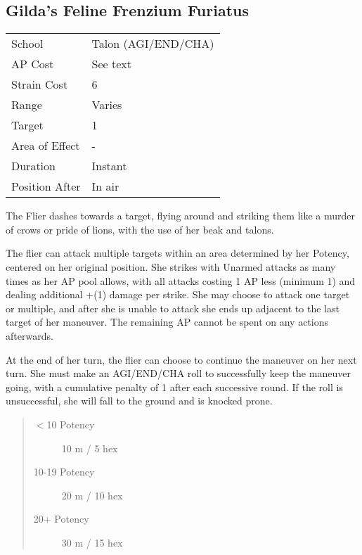 \documentclass[11pt,a4paper,twocolumn]{book}
\begin{document}

\subsection*{Gilda's Feline Frenzium Furiatus}
{
	\begin{tabu} to 75mm{| X[l,4] | X[l,7] |}
		\hline
		School 			& Talon (AGI/END/CHA)			\\
		AP Cost	      	& See text   	\\
		Strain Cost     & 6 				\\
		Range     		& Varies 		\\
		Target      	& 1 				\\
		Area of Effect  & - 	 			\\
		Duration     	& Instant 	 		\\
		Position After  & In air 			\\ \hline
	\end{tabu}
	
}

\medskip

The Flier dashes towards a target, flying around and striking them like a murder of crows or pride of lions, with the use of her beak and talons.

The flier can attack multiple targets within an area determined by her Potency, centered on her original position. She strikes with Unarmed attacks as many times as her AP pool allows, with all attacks costing 1 AP less (minimum 1) and dealing additional +(1) damage per strike. She may choose to attack one target or multiple, and after she is unable to attack she ends up adjacent to the last target of her maneuver. The remaining AP cannot be spent on any actions afterwards.

At the end of her turn, the flier can choose to continue the maneuver on her next turn. She must make an AGI/END/CHA roll to successfully keep the maneuver going, with a cumulative penalty of 1 after each successive round. If the roll is unsuccessful, she will fall to the ground and is knocked prone.

\begin{quote}
	\begin{description}
		\item[$<$10 Potency] 	10 m / 5 hex
		\item[10-19 Potency] 	20 m / 10 hex
		\item[20+ Potency] 	30 m / 15 hex
	\end{description}
\end{quote}
\end{document}
